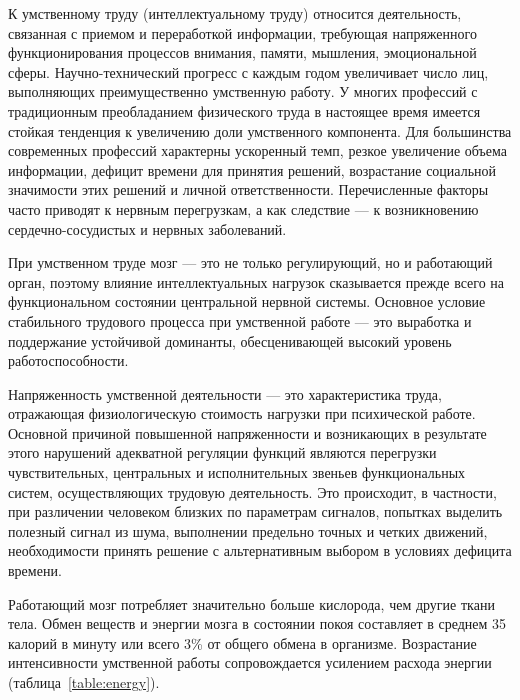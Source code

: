 \documentclass[14pt,a4paper]{reportmod}
\begin{document}
К умственному труду (интеллектуальному труду) относится деятельность, связанная с приемом и переработкой информации, требующая напряженного функционирования процессов внимания, памяти, мышления, эмоциональной сферы. Научно-технический прогресс с каждым годом увеличивает число лиц, выполняющих преимущественно умственную работу. У многих профессий с традиционным преобладанием физического труда в настоящее время имеется стойкая тенденция к увеличению доли умственного компонента. Для большинства современных профессий характерны ускоренный темп, резкое увеличение объема информации, дефицит времени для принятия решений, возрастание социальной значимости этих решений и личной ответственности. Перечисленные факторы часто приводят к нервным перегрузкам, а как следствие — к возникновению сердечно-сосудистых и нервных заболеваний.


При умственном труде мозг --- это не только регулирующий, но и работающий орган, поэтому влияние интеллектуальных нагрузок сказывается прежде всего на функциональном состоянии центральной нервной системы. Основное условие стабильного трудового процесса при умственной работе --- это выработка и поддержание устойчивой доминанты, обесценивающей высокий уровень работоспособности.


Напряженность умственной деятельности --- это характеристика труда, отражающая физиологическую стоимость нагрузки при психической работе. Основной причиной повышенной напряженности и возникающих в результате этого нарушений адекватной регуляции функций являются перегрузки чувствительных, центральных и исполнительных звеньев функциональных систем, осуществляющих трудовую деятельность. Это происходит, в частности, при различении человеком близких по параметрам сигналов, попытках выделить полезный сигнал из шума, выполнении предельно точных и четких движений, необходимости принять решение с альтернативным выбором в условиях дефицита времени.


Работающий мозг потребляет значительно больше кислорода, чем другие ткани тела. Обмен веществ и энергии мозга в состоянии покоя составляет в среднем 35 калорий в минуту или всего 3\% от общего обмена в организме. Возрастание интенсивности умственной работы сопровождается усилением расхода энергии (таблица~\ref{table:energy}).
\end{document}
